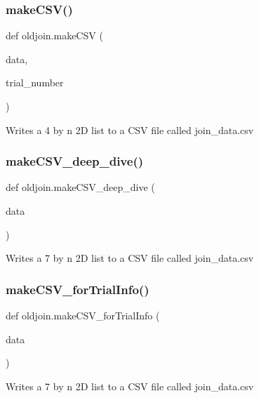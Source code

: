 \subsubsection{\texorpdfstring{makeCSV()}{makeCSV()}}
{\footnotesize\ttfamily def oldjoin.\+make\+C\+SV (\begin{DoxyParamCaption}\item[{}]{data,  }\item[{}]{trial\+\_\+number }\end{DoxyParamCaption})}

\begin{DoxyVerb}Writes a 4 by n 2D list to a CSV file called join_data.csv \end{DoxyVerb}
 \mbox{\label{namespaceoldjoin_af8c01b7cf6d0ed355ba3bd5ce60b92fe}} 
\subsubsection{\texorpdfstring{makeCSV\_deep\_dive()}{makeCSV\_deep\_dive()}}
{\footnotesize\ttfamily def oldjoin.\+make\+C\+S\+V\+\_\+deep\+\_\+dive (\begin{DoxyParamCaption}\item[{}]{data }\end{DoxyParamCaption})}

\begin{DoxyVerb}Writes a 7 by n 2D list to a CSV file called join_data.csv \end{DoxyVerb}
 \mbox{\label{namespaceoldjoin_a57cd17251a242e4b70c053b463abc920}} 
\subsubsection{\texorpdfstring{makeCSV\_forTrialInfo()}{makeCSV\_forTrialInfo()}}
{\footnotesize\ttfamily def oldjoin.\+make\+C\+S\+V\+\_\+for\+Trial\+Info (\begin{DoxyParamCaption}\item[{}]{data }\end{DoxyParamCaption})}

\begin{DoxyVerb}Writes a 7 by n 2D list to a CSV file called join_data.csv \end{DoxyVerb}
 \mbox{\label{namespaceoldjoin_acd67830af4aecf91efa9c32ba4ad060a}} 
